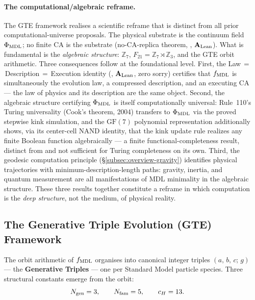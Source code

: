 \paragraph{The computational/algebraic reframe.}
The GTE framework realises a scientific reframe that is distinct from all prior
computational-universe proposals.  The physical substrate is the continuum field
$\Phi_{\rm MDL}$; no finite CA is the substrate (no-CA-replica theorem,
, $\mathbf{A}_{\rm Lean}$).  What is
fundamental is the \emph{algebraic structure}: $\mathbb{Z}_7$, $F_{21} =
\mathbb{Z}_7\rtimes\mathbb{Z}_3$, and the GTE orbit arithmetic.  Three consequences
follow at the foundational level.  First, the Law\,$=$\,Description\,$=$\,Execution
identity (, $\mathbf{A}_{\rm Lean}$,
zero sorry) certifies that $f_{\rm MDL}$ is simultaneously the evolution law, a
compressed description, and an executing CA --- the law of physics and its
description are the same object.  Second, the algebraic structure certifying
$\Phi_{\rm MDL}$ is itself computationally universal: Rule~110's Turing universality
(Cook's theorem, 2004) transfers to $\Phi_{\rm MDL}$ via the proved stepwise kink
simulation, and the $\mathrm{GF}(7)$ polynomial representation additionally shows, via
its center-cell NAND identity, that the kink update rule realizes any finite Boolean
function algebraically --- a finite functional-completeness result, distinct from and
not sufficient for Turing completeness on its own.  Third, the geodesic computation
principle (\S\ref{subsec:overview-gravity})
identifies physical trajectories with minimum-description-length paths: gravity,
inertia, and quantum measurement are all manifestations of MDL minimality in
the algebraic structure.  These three results together constitute a reframe in which
computation is the \emph{deep structure}, not the medium, of physical reality.

\subsection{The Generative Triple Evolution (GTE) Framework}
\label{subsec:overview-gte}

The orbit arithmetic of $f_{\rm MDL}$ organises into canonical integer triples
$(a,\,b,\,c;\,g)$ --- the \textbf{Generative Triples} --- one per Standard Model
particle species.  Three structural constants emerge from the orbit:
\[
  N_{\rm gen} = 3, \qquad N_{\rm fam} = 5, \qquad c_H = 13.
\]

